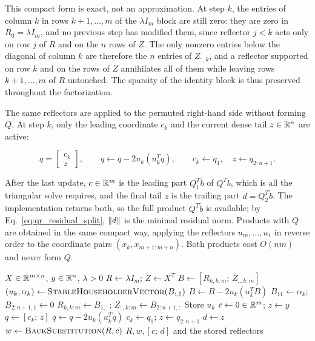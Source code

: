 \noindent This compact form is exact, not an approximation. At step $k$, the
entries of column $k$ in rows $k+1,\dots,m$ of the $\lambda I_m$ block are
still zero: they are zero in $R_0=\lambda I_m$, and no previous step has
modified them, since reflector $j<k$ acts only on row $j$ of $R$ and on the
$n$ rows of $Z$. The only nonzero entries below the diagonal of column $k$
are therefore the $n$ entries of $Z_{:,k}$, and a reflector supported on row
$k$ and on the rows of $Z$ annihilates all of them while leaving rows
$k+1,\dots,m$ of $R$ untouched. The sparsity of the identity block is thus
preserved throughout the factorization.

\noindent The same reflectors are applied to the permuted right-hand side without
forming $Q$. At step $k$, only the leading coordinate $c_k$ and the current
dense tail $z\in\mathbb{R}^n$ are active:

\begin{equation}
\label{eq:structure_rhs_update}
    q=\begin{bmatrix}c_k\\z\end{bmatrix},
    \qquad
    q\leftarrow q-2u_k(u_k^T q),
    \qquad
    c_k\leftarrow q_1,
    \quad z\leftarrow q_{2:n+1}.
\end{equation}

\noindent After the last update, $c\in\mathbb{R}^m$ is the leading part
$Q_1^T\tilde b$ of $Q^T\tilde b$, which is all the triangular solve requires,
and the final tail $z$ is the trailing part $d = Q_2^T\tilde b$. The
implementation returns both, so the full product $Q^T\tilde b$ is available;
by Eq.~\eqref{eq:qr_residual_split}, $\left\|d\right\|$ is the minimal residual norm.
Products with $Q$ are obtained in the same compact way, applying the reflectors
$u_m, \ldots, u_1$ in reverse order to the coordinate pairs $(x_k, x_{m+1:m+n})$.
Both products cost $O(nm)$ and never form $Q$.

\begin{algorithm}[H]
\caption{Structure-Based Householder QR by Columns}
\label{alg:structure_based_householder}
\begin{algorithmic}[1]
    \Require $X\in\mathbb{R}^{m\times n}$, $y\in\mathbb{R}^n$, $\lambda>0$
    \State $R\gets\lambda I_m$; \quad $Z\gets X^T$
        \State $B\gets[R_{k,k:m};\,Z_{:,k:m}]$
        \State $(u_k,\alpha_k)\gets\Call{StableHouseholderVector}{B_{:,1}}$
            \State $B\gets B-2u_k(u_k^T B)$
        \EndIf
        \State $B_{11}\gets\alpha_k$; \quad $B_{2:n+1,1}\gets0$
        \State $R_{k,k:m}\gets B_{1,:}$; \quad $Z_{:,k:m}\gets B_{2:n+1,:}$
        \State Store $u_k$
    \EndFor
    \State $c\gets0\in\mathbb{R}^m$; \quad $z\gets y$
        \State $q\gets[c_k;\,z]$
            \State $q\gets q-2u_k(u_k^T q)$
        \EndIf
        \State $c_k\gets q_1$; \quad $z\gets q_{2:n+1}$
    \EndFor
    \State $d\gets z$ 
    \State $w\gets\Call{BackSubstitution}{R,c}$
    \State \Return $R,w,[c;\,d]$ and the stored reflectors
\end{algorithmic}
\end{algorithm}

